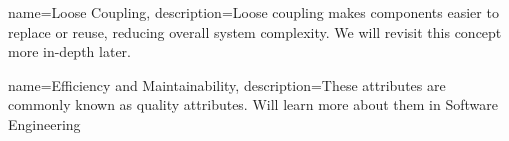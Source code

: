 \makeglossaries

{
    name=Loose Coupling,
    description={Loose coupling makes components easier to replace or reuse, reducing overall system
    complexity. We will revisit this concept more in-depth later.}
}

{
    name=Efficiency and Maintainability,
    description=These attributes are commonly known as quality attributes. Will learn more about
    them in Software Engineering 
}
